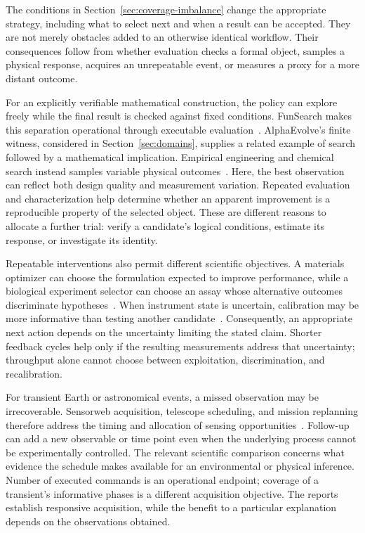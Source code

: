The conditions in Section~\ref{sec:coverage-imbalance} change the appropriate strategy, including what to select next and when a result can be accepted. They are not merely obstacles added to an otherwise identical workflow. Their consequences follow from whether evaluation checks a formal object, samples a physical response, acquires an unrepeatable event, or measures a proxy for a more distant outcome.

For an explicitly verifiable mathematical construction, the policy can explore freely while the final result is checked against fixed conditions. FunSearch makes this separation operational through executable evaluation~\cite{asd0512}. AlphaEvolve's finite witness, considered in Section~\ref{sec:domains}, supplies a related example of search followed by a mathematical implication. Empirical engineering and chemical search instead samples variable physical outcomes~\cite{asd0504,asd0734}. Here, the best observation can reflect both design quality and measurement variation. Repeated evaluation and characterization help determine whether an apparent improvement is a reproducible property of the selected object. These are different reasons to allocate a further trial: verify a candidate's logical conditions, estimate its response, or investigate its identity.

Repeatable interventions also permit different scientific objectives. A materials optimizer can choose the formulation expected to improve performance, while a biological experiment selector can choose an assay whose alternative outcomes discriminate hypotheses~\cite{burger2020,king2004}. When instrument state is uncertain, calibration may be more informative than testing another candidate~\cite{asd0090}. Consequently, an appropriate next action depends on the uncertainty limiting the stated claim. Shorter feedback cycles help only if the resulting measurements address that uncertainty; throughput alone cannot choose between exploitation, discrimination, and recalibration.

For transient Earth or astronomical events, a missed observation may be irrecoverable. Sensorweb acquisition, telescope scheduling, and mission replanning therefore address the timing and allocation of sensing opportunities~\cite{asd0722,asd0136,asd0645}. Follow-up can add a new observable or time point even when the underlying process cannot be experimentally controlled. The relevant scientific comparison concerns what evidence the schedule makes available for an environmental or physical inference. Number of executed commands is an operational endpoint; coverage of a transient's informative phases is a different acquisition objective. The reports establish responsive acquisition, while the benefit to a particular explanation depends on the observations obtained.

